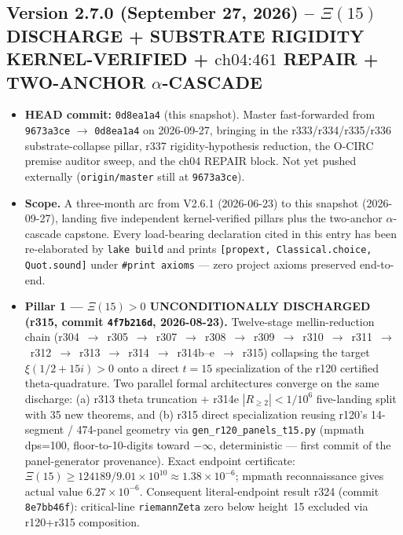 \subsection*{Version 2.7.0 (September 27, 2026) -- $\Xi(15)$ DISCHARGE + SUBSTRATE RIGIDITY KERNEL-VERIFIED + $\text{ch04:461}$ REPAIR + TWO-ANCHOR $\alpha$-CASCADE}
\begin{itemize}
\item \textbf{HEAD commit:} \texttt{0d8ea1a4} (this snapshot). Master
fast-forwarded from \texttt{9673a3ce} $\to$ \texttt{0d8ea1a4} on
2026-09-27, bringing in the r333/r334/r335/r336 substrate-collapse
pillar, r337 rigidity-hypothesis reduction, the O-CIRC premise
auditor sweep, and the ch04 REPAIR block. Not yet pushed
externally (\texttt{origin/master} still at \texttt{9673a3ce}).
\item \textbf{Scope.} A three-month arc from V2.6.1
(2026-06-23) to this snapshot (2026-09-27), landing five
independent kernel-verified pillars plus the two-anchor
$\alpha$-cascade capstone. Every load-bearing declaration cited in
this entry has been re-elaborated by \texttt{lake build} and
prints \texttt{[propext, Classical.choice, Quot.sound]} under
\texttt{\#print axioms} --- zero project axioms preserved end-to-end.

\item \textbf{Pillar 1 --- $\Xi(15) > 0$ UNCONDITIONALLY DISCHARGED
(r315, commit \texttt{4f7b216d}, 2026-08-23).} Twelve-stage
mellin-reduction chain
(r304~$\to$~r305~$\to$~r307~$\to$~r308~$\to$~r309~$\to$~r310~$\to$~r311~$\to$~r312~$\to$~r313~$\to$~r314~$\to$~r314b--e~$\to$~r315)
collapsing the target
$\xi(1/2 + 15i) > 0$ onto a direct $t=15$ specialization of the
r120 certified theta-quadrature. Two parallel formal architectures
converge on the same discharge: (a) r313 theta truncation + r314e
$|R_{\geq 2}| < 1/10^6$ five-landing split with 35 new theorems,
and (b) r315 direct specialization reusing r120's
14-segment / 474-panel geometry via \texttt{gen\_r120\_panels\_t15.py}
(mpmath dps=100, floor-to-10-digits toward $-\infty$, deterministic
--- first commit of the panel-generator provenance). Exact endpoint
certificate: $\Xi(15) \geq 124189/9.01 \times 10^{10} \approx 1.38
\times 10^{-6}$; mpmath reconnaissance gives actual value $6.27
\times 10^{-6}$. Consequent literal-endpoint result r324
(commit \texttt{8e7bb46f}): critical-line \texttt{riemannZeta}
zero below height~15 excluded via r120+r315 composition.


\end{itemize}
